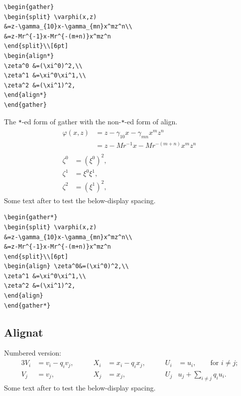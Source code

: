 \documentclass{article}
\newcommand{\ntt}{\normalfont\ttfamily}
\newcommand{\env}[1]{{\protect\ntt#1}}
\theoremstyle{definition}
\theoremstyle{remark}
\begin{document}
\begin{verbatim}
\begin{gather}
\begin{split} \varphi(x,z)
&=z-\gamma_{10}x-\gamma_{mn}x^mz^n\\
&=z-Mr^{-1}x-Mr^{-(m+n)}x^mz^n
\end{split}\\[6pt]
\begin{align*}
\zeta^0 &=(\xi^0)^2,\\
\zeta^1 &=\xi^0\xi^1,\\
\zeta^2 &=(\xi^1)^2,
\end{align*}
\end{gather}
\end{verbatim}

The \verb"*"-ed form of \env{gather} with the non-\verb"*"-ed form of
\env{align}.
\begin{gather*}
\begin{split} \varphi(x,z)
&=z-\gamma_{10}x-\gamma_{mn}x^mz^n\\
&=z-Mr^{-1}x-Mr^{-(m+n)}x^mz^n
\end{split}\\[6pt]
\begin{align} \zeta^0&=(\xi^0)^2,\\
\zeta^1 &=\xi^0\xi^1,\\
\zeta^2 &=(\xi^1)^2,
\end{align}
\end{gather*}
Some text after to test the below-display spacing.

\begin{verbatim}
\begin{gather*}
\begin{split} \varphi(x,z)
&=z-\gamma_{10}x-\gamma_{mn}x^mz^n\\
&=z-Mr^{-1}x-Mr^{-(m+n)}x^mz^n
\end{split}\\[6pt]
\begin{align} \zeta^0&=(\xi^0)^2,\\
\zeta^1 &=\xi^0\xi^1,\\
\zeta^2 &=(\xi^1)^2,
\end{align}
\end{gather*}
\end{verbatim}

\newpage
\subsection{Alignat}
Numbered version:
\begin{alignat}{3}
V_i & =v_i - q_i v_j, & \qquad X_i & = x_i - q_i x_j,
 & \qquad U_i & = u_i,
 \qquad \text{for $i\ne j$;}\label{eq:B}\\
V_j & = v_j, & \qquad X_j & = x_j,
  & \qquad U_j & u_j + \sum_{i\ne j} q_i u_i.
\end{alignat}
Some text after to test the below-display spacing.
\end{document}
